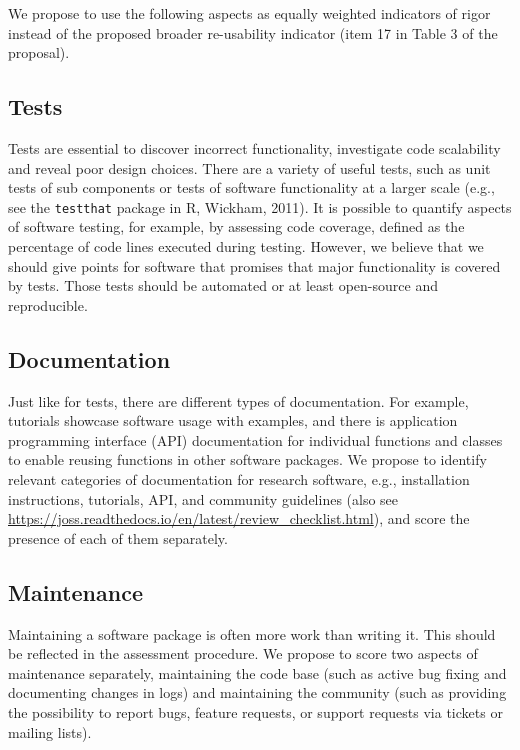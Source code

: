 \documentclass[
  man]{apa6}
\begin{document}
We propose to use the following aspects as equally weighted indicators of rigor instead of the proposed broader re-usability indicator (item 17 in Table 3 of the proposal).

\hypertarget{tests}{%
\subsection{Tests}\label{tests}}

Tests are essential to discover incorrect functionality, investigate code scalability and reveal poor design choices.
There are a variety of useful tests, such as unit tests of sub components or tests of software functionality at a larger scale (e.g., see the \texttt{testthat} package in R, Wickham, 2011).
It is possible to quantify aspects of software testing, for example, by assessing code coverage, defined as the percentage of code lines executed during testing.
However, we believe that we should give points for software that promises that major functionality is covered by tests.
Those tests should be automated or at least open-source and reproducible.

\hypertarget{documentation}{%
\subsection{Documentation}\label{documentation}}

Just like for tests, there are different types of documentation.
For example, tutorials showcase software usage with examples, and there is application programming interface (API) documentation for individual functions and classes to enable reusing functions in other software packages.
We propose to identify relevant categories of documentation for research software, e.g., installation instructions, tutorials, API, and community guidelines (also see \url{https://joss.readthedocs.io/en/latest/review_checklist.html}), and score the presence of each of them separately.

\hypertarget{maintenance}{%
\subsection{Maintenance}\label{maintenance}}

Maintaining a software package is often more work than writing it.
This should be reflected in the assessment procedure.
We propose to score two aspects of maintenance separately, maintaining the code base (such as active bug fixing and documenting changes in logs) and maintaining the community (such as providing the possibility to report bugs, feature requests, or support requests via tickets or mailing lists).
\end{document}

